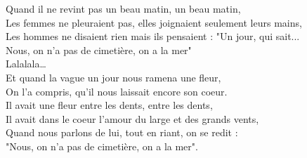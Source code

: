 \documentclass{novel}
\begin{document}
Quand il ne revint pas un beau matin, un beau matin, \\
Les femmes ne pleuraient pas, elles joignaient seulement leurs mains, \\
Les hommes ne disaient rien mais ils pensaient : "Un jour, qui sait... \\
Nous, on n'a pas de cimetière, on a la mer" \\

Lalalala… \\
Et quand la vague un jour nous ramena une fleur, \\
On l'a compris, qu'il nous laissait encore son coeur. \\

Il avait une fleur entre les dents, entre les dents, \\
Il avait dans le coeur l'amour du large et des grands vents, \\
Quand nous parlons de lui, tout en riant, on se redit : \\
"Nous, on n'a pas de cimetière, on a la mer".
\end{document}
